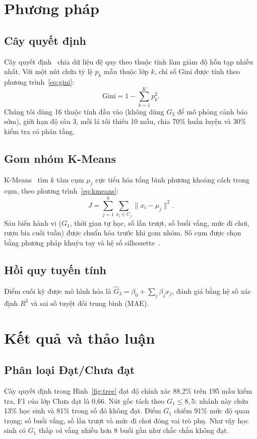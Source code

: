 \documentclass[runningheads]{llncs}
\begin{document}
\section{Phương pháp}\label{sec:method}
\subsection{Cây quyết định}
Cây quyết định~\cite{quinlan1986} chia dữ liệu đệ quy theo thuộc tính làm giảm độ hỗn tạp
nhiều nhất. Với một nút chứa tỷ lệ $p_k$ mẫu thuộc lớp $k$, chỉ số Gini được tính theo
phương trình~\eqref{eq:gini}:
\begin{equation}\label{eq:gini}
  \mathrm{Gini} = 1 - \sum_{k=1}^{K} p_k^{2}.
\end{equation}
Chúng tôi dùng 16 thuộc tính đầu vào (không dùng $G_2$ để mô phỏng cảnh báo sớm), giới hạn
độ sâu 3, mỗi lá tối thiểu 10 mẫu, chia 70\% huấn luyện và 30\% kiểm tra có phân tầng.

\subsection{Gom nhóm K-Means}
K-Means~\cite{lloyd1982} tìm $k$ tâm cụm $\mu_j$ cực tiểu hóa tổng bình phương khoảng cách
trong cụm, theo phương trình~\eqref{eq:kmeans}:
\begin{equation}\label{eq:kmeans}
  J = \sum_{j=1}^{k} \sum_{x_i \in C_j} \lVert x_i - \mu_j \rVert^{2}.
\end{equation}
Sáu biến hành vi ($G_1$, thời gian tự học, số lần trượt, số buổi vắng, mức đi chơi, rượu bia
cuối tuần) được chuẩn hóa trước khi gom nhóm. Số cụm được chọn bằng phương pháp khuỷu tay và
hệ số silhouette~\cite{rousseeuw1987}.

\subsection{Hồi quy tuyến tính}
Điểm cuối kỳ được mô hình hóa là $\hat{G}_3 = \beta_0 + \sum_{j}\beta_j x_j$, đánh giá bằng
hệ số xác định $R^2$ và sai số tuyệt đối trung bình (MAE).

\section{Kết quả và thảo luận}\label{sec:result}
\subsection{Phân loại Đạt/Chưa đạt}
Cây quyết định trong Hình~\ref{fig:tree} đạt độ chính xác 88,2\% trên 195 mẫu kiểm tra, F1
của lớp Chưa đạt là 0,66. Nút gốc tách theo $G_1 \le 8{,}5$: nhánh này chứa 13\% học sinh và
81\% trong số đó không đạt. Điểm $G_1$ chiếm 91\% mức độ quan trọng; số buổi vắng, số lần
trượt và mức đi chơi đóng vai trò phụ. Như vậy học sinh có $G_1$ thấp \emph{và} vắng nhiều hơn
8 buổi gần như chắc chắn không đạt.
\end{document}
